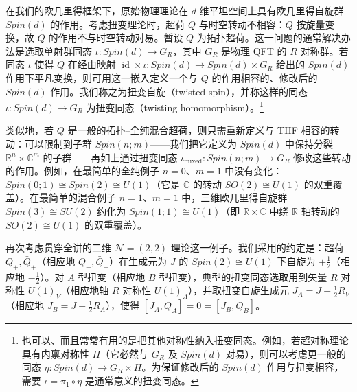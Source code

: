 在我们的欧几里得框架下，原始物理理论在 $d$ 维平坦空间上具有欧几里得自旋群 $Spin(d)$ 的作用。考虑扭变理论时，超荷 $Q$ 与时空转动不相容：$Q$ 按旋量变换，故 $Q$ 的作用不与时空转动对易。暂设 $Q$ 为拓扑超荷。这一问题的通常解决办法是选取单射群同态 $\iota:Spin(d)\to G_R$，其中 $G_R$ 是物理 QFT 的 $R$ 对称群。若同态 $\iota$ 使得 $Q$ 在经由映射 $\operatorname{id}\times\iota:Spin(d)\to Spin(d)\times G_R$ 给出的 $Spin(d)$ 作用下平凡变换，则可用这一嵌入定义一个与 $Q$ 的作用相容的、修改后的 $Spin(d)$ 作用。我们称之为扭变自旋（twisted spin），并称这样的同态 $\iota:Spin(d)\to G_R$ 为扭变同态（twisting homomorphism）。\footnote{也可以、而且常常有用的是把其他对称性纳入扭变同态。例如，若超对称理论具有内禀对称性 $H$（它必然与 $G_R$ 及 $Spin(d)$ 对易），则可以考虑更一般的同态 $\eta:Spin(d)\to G_R\times H$。为保证修改后的 $Spin(d)$ 作用与扭变相容，需要 $\iota=\pi_1\circ\eta$ 是通常意义的扭变同态。}

类似地，若 $Q$ 是一般的拓扑--全纯混合超荷，则只需重新定义与 THF 相容的转动：可以限制到子群 $Spin(n;m)$——我们把它定义为 $Spin(d)$ 中保持分裂 $\mathbb{R}^n\times\mathbb{C}^m$ 的子群——再如上通过扭变同态 $\iota_{\mathrm{mixed}}:Spin(n;m)\to G_R$ 修改这些转动的作用。例如，在最简单的全纯例子 $n=0$、$m=1$ 中没有变化：$Spin(0;1)\cong Spin(2)\cong U(1)$（它是 $\mathbb{C}$ 的转动 $SO(2)\cong U(1)$ 的双重覆盖）。在最简单的混合例子 $n=1$、$m=1$ 中，三维欧几里得自旋群 $Spin(3)\cong SU(2)$ 约化为 $Spin(1;1)\cong U(1)$（即 $\mathbb{R}\times\mathbb{C}$ 中绕 $\mathbb{R}$ 轴转动的 $SO(2)\cong U(1)$ 的双重覆盖）。


再次考虑贯穿全讲的二维 $\mathcal{N}=(2,2)$ 理论这一例子。我们采用的约定是：超荷 $Q_+,\bar Q_+$（相应地 $Q_-,\bar Q_-$）在生成元为 $J$ 的 $Spin(2)\cong U(1)$ 下自旋为 $+\frac12$（相应地 $-\frac12$）。对 $A$ 型扭变（相应地 $B$ 型扭变），典型的扭变同态选取用到矢量 $R$ 对称性 $U(1)_V$（相应地轴 $R$ 对称性 $U(1)_A$），并取扭变自旋生成元 $J_A=J+\frac12 R_V$（相应地 $J_B=J+\frac12 R_A$），使得 $[J_A,Q_A]=0=[J_B,Q_B]$。

